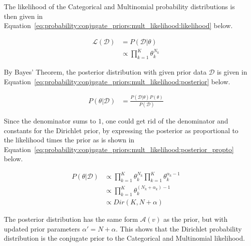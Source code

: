 \noindent
The likelihood of the Categorical and Multinomial probability distributions is then given in Equation~\eqref{eq:probability:conjugate_priors:mult_likelihood:likelihood} below.

\begin{equation}
      \label{eq:probability:conjugate_priors:mult_likelihood:likelihood}
      \begin{split}
            \mathcal{L}(\mathcal{D}) &=  P(\mathcal{D} | \theta) \\
            &\propto \prod_{k=1}^{K} \theta_{k}^{N_{k}}
      \end{split}
\end{equation}

\noindent
By Bayes' Theorem, the posterior distribution with given prior data $\mathcal{D}$ is given in Equation~\eqref{eq:probability:conjugate_priors:mult_likelihood:posterior} below.

\begin{equation}
      \label{eq:probability:conjugate_priors:mult_likelihood:posterior}
      \begin{split}
            P(\theta \vert \mathcal{D}) &= \frac{P(\mathcal{D} \vert \theta) P(\theta)}{P(\mathcal{D})}
      \end{split}
\end{equation}

\noindent
Since the denominator sums to $1$, one could get rid of the denominator and constants for the Dirichlet prior, by expressing the posterior as proportional to the likelihood times the prior as is shown in Equation~\eqref{eq:probability:conjugate_priors:mult_likelihood:posterior_propto} below.

\begin{equation}
      \label{eq:probability:conjugate_priors:mult_likelihood:posterior_propto}
      \begin{split}
            P(\theta \vert \mathcal{D}) &\propto \prod_{k=1}^{K} \theta_{k}^{N_{k}} \prod_{k=1}^{K} \theta_{k}^{\alpha_{k} - 1}\\
            &\propto \prod_{k=1}^{K} \theta_{k}^{(N_{k} + \alpha_{k}) - 1} \\
            &\propto Dir(K, N + \alpha)
      \end{split}
\end{equation}

\noindent
The posterior distribution has the same form $\mathcal{A}(v)$ as the prior, but with updated prior parameters $\alpha' = N + \alpha$. This shows that the Dirichlet probability distribution is the conjugate prior to the Categorical and Multinomial likelihood.

